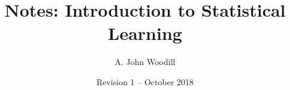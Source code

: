 \documentclass[11pt]{article}%
\title{Notes: Introduction to Statistical Learning}
\author{A. John Woodill \date{\normalsize Revision 1 -- October 2018}}
\begin{document}
\maketitle

\newpage

\tableofcontents

\newpage

\singlespacing

\end{document}
